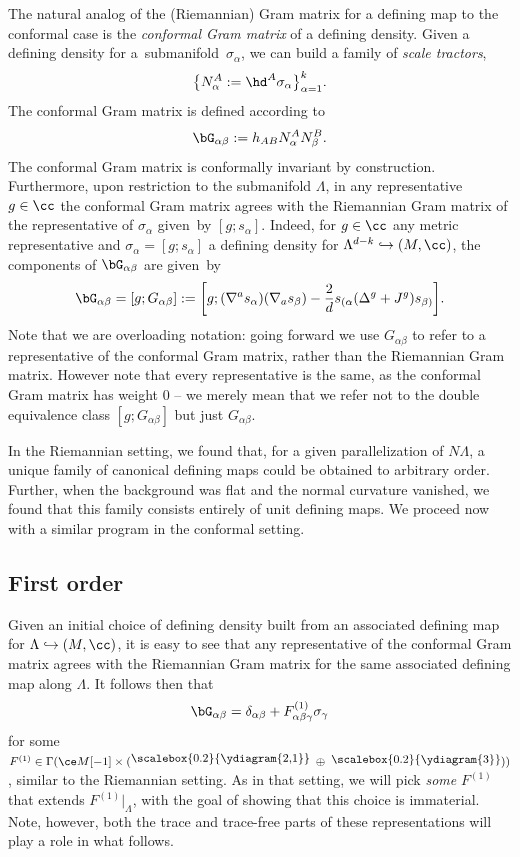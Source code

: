 The natural analog of the (Riemannian) Gram matrix for a defining map to the conformal case is the \textit{conformal Gram matrix} of a defining density. Given a defining density for a~submanifold~$\sigma_\alpha$, we can build a family of \textit{scale tractors},
\[\big\{N^A_{\alpha} := \hd^A \sigma_{\alpha} \big\}_{\alpha = 1}^k .\]
The conformal Gram matrix is defined according to
\[\bG_{\alpha \beta} := h_{AB} N^A_{\alpha} N^B_{\beta} .\]
The conformal Gram matrix is conformally invariant by construction. Furthermore, upon restriction to the submanifold $\Lambda$, in any representative $g \in \cc$ the conformal Gram matrix agrees with the Riemannian Gram matrix of the representative of $\sigma_{\alpha}$ given~by $[g; s_{\alpha}]$. Indeed, for $g \in \cc$ any metric representative and $\sigma_{\alpha} = [g;s_{\alpha}]$ a defining density for $\Lambda^{d-k} \hookrightarrow (M,\cc)$, the components of $\bG_{\alpha \beta}$ are given~by
\[\bG_{\alpha \beta} = [g; G_{\alpha \beta}] := \biggl[g; (\nabla^a s_{\alpha})(\nabla_a s_{\beta}) - \frac{2}{d} s_{(\alpha} (\Delta^g + J^g) s_{\beta)}\biggr] .\]
Note that we are overloading notation: going forward we use $G_{\alpha \beta}$ to refer to a representative of the conformal Gram matrix, rather than the Riemannian Gram matrix. However note that every representative is the same, as the conformal Gram matrix has weight 0 -- we merely mean that we refer not to the double equivalence class $[g;G_{\alpha \beta}]$ but just $G_{\alpha \beta}$.



In the Riemannian setting, we found that, for a given parallelization of $N \Lambda$, a unique family of canonical defining maps could be obtained to arbitrary order. Further, when the background was flat and the normal curvature vanished, we found that this family consists entirely of unit defining maps. We proceed now with a similar program in the conformal setting.

\subsection{First order} \label{conf-first-order}
Given an initial choice of defining density built from an associated defining map for $\Lambda \hookrightarrow (M,\cc)$, it is easy to see that any representative of the conformal Gram matrix agrees with the Riemannian Gram matrix for the same associated defining map along $\Lambda$. It follows then that
\[\bG_{\alpha \beta} = \delta_{\alpha \beta} + F^{(1)}_{\alpha \beta \gamma} \sigma_{\gamma} \]
for some $F^{(1)} \in \Gamma(\ce M[-1] \times (\raisebox{3pt}{\scalebox{0.2}{\ydiagram{2,1}}} \; \oplus \; \raisebox{2pt}{\scalebox{0.2}{\ydiagram{3}}}))$, similar to the Riemannian setting. As in that setting, we will pick \textit{some} $F^{(1)}$ that extends $F^{(1)}|_{\Lambda}$, with the goal of showing that this choice is immaterial. Note, however, both the trace and trace-free parts of these representations will play a role in what follows.

